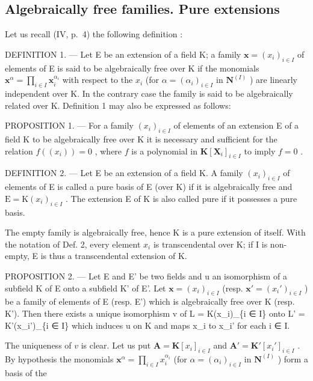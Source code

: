 \subsection{Algebraically free families. Pure extensions}

Let us recall (IV, p.~4) the following definition :

DEFINITION 1. --- Let E be an extension of a field K; a family \(\mathbf{x} = (x_i)_{i \in I}\) of elements of E is said to be algebraically free over K if the monomials \(\mathbf{x}^\alpha = \prod_{i \in I} \mathbf{x}_i^{\alpha_i}\) with respect to the \(x_i\) (for \(\alpha = (\alpha_i)_{i \in I}\) in \(\mathbf{N}^{(I)}\) ) are linearly independent over K. In the contrary case the family is said to be algebraically related over K. Definition 1 may also be expressed as follows:

PROPOSITION 1. --- For a family \((x_{i})_{i\in I}\) of elements of an extension E of a field K to be algebraically free over K it is necessary and sufficient for the relation \(f((x_i)) = 0\) , where \(f\) is a polynomial in \(\mathbf{K}[\mathbf{X}_i]_{i\in I}\) to imply \(f = 0\) .

DEFINITION 2. --- Let E be an extension of a field K. A family \((x_{i})_{i\in I}\) of elements of E is called a pure basis of E (over K) if it is algebraically free and \(\mathrm{E}=\mathrm{K}(x_{i})_{i\in I}\) . The extension E of K is also called pure if it possesses a pure basis.

The empty family is algebraically free, hence K is a pure extension of itself. With the notation of Def. 2, every element \(x_{i}\) is transcendental over K; if I is non-empty, E is thus a transcendental extension of K.

PROPOSITION 2. --- Let E and E' be two fields and u an isomorphism of a subfield K of E onto a subfield K' of E'. Let \(\mathbf{x} = (x_i)_{i \in I}\) (resp. \(\mathbf{x}' = (x_i')_{i \in I}\) ) be a family of elements of E (resp. E') which is algebraically free over K (resp. K'). Then there exists a unique isomorphism v of L = K(x\_i)\_\{i ∈ I\} onto L' = K'(x\_i')\_\{i ∈ I\} which induces u on K and maps x\_i to x\_i' for each i ∈ I.

The uniqueness of \(v\) is clear. Let us put \(\mathbf{A} = \mathbf{K}[x_i]_{i \in I}\) and \(\mathbf{A}' = \mathbf{K}'[x_i']_{i \in I}\) . By hypothesis the monomials \(\mathbf{x}^\alpha = \prod_{i \in I} x_i^{\alpha_i}\) (for \(\alpha = (\alpha_i)_{i \in I}\) in \(\mathbf{N}^{(I)}\) ) form a basis of the

